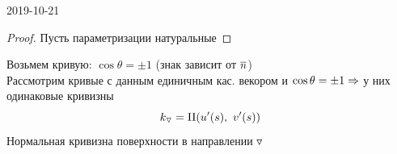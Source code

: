 \documentclass[main]{subfiles}
\begin{document}
\begin{lect} {2019-10-21}
		\begin{proof}
			Пусть параметризации натуральные
		\end{proof}

		Возьмем кривую: $\cos \theta = \pm 1$ (знак зависит от $\overline{n}$)\\
		Рассмотрим кривые с данным единичным кас. векором и $\cos \theta = \pm 1 \Rightarrow$ у них одинаковые кривизны
		\[k_{\triangledown} = \RNumb{2}(u'(s),\ v'(s))\]
		Нормальная кривизна поверхности в направлении $\triangledown$
	\end{lect}
\end{document}
